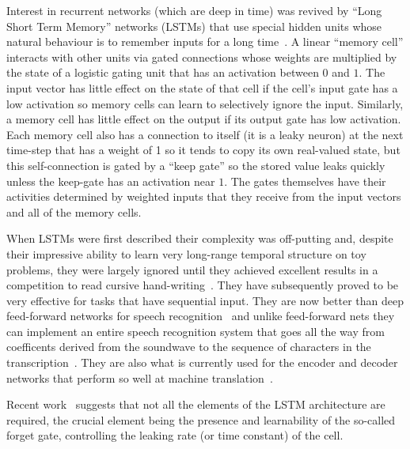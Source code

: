 \documentclass[]{article}
\begin{document}
Interest in recurrent networks (which are deep in time) was revived by
``Long Short Term Memory'' networks (LSTMs) that use special hidden units
whose natural behaviour is to remember inputs for a long
time~\citep{Hochreiter+Schmidhuber-1997}.  
A linear ``memory cell'' interacts with other units
via gated connections whose weights are multiplied by the state of a
logistic gating unit that has an activation between $0$ and $1$. The input
vector has little effect on the state of that cell if the cell's input
gate has a low activation so memory cells can learn to selectively ignore
the input.  Similarly, a memory cell has little effect on the output if its
output gate has low activation. Each memory cell also has a connection to
itself (it is a leaky neuron) at the next time-step that has a weight of 1 so it tends to copy its
own real-valued state, but this self-connection is gated by a ``keep gate'' so
the stored value leaks quickly unless the keep-gate has an activation
near $1$.  The gates themselves have their activities determined by
weighted inputs that they receive from the input vectors and all of the
memory cells.

When LSTMs were first described %
\citep{Hochreiter+Schmidhuber-1997} their complexity was off-putting
and, despite their impressive ability to learn very long-range temporal
structure on toy problems, they were largely ignored until they achieved
excellent results in a competition to read cursive
hand-writing~\citep{Graves-et-al-2009}. They have subsequently proved to be very
effective for tasks that have sequential input.  They are now better than
deep feed-forward networks for speech recognition~\citep{gravestimit} and
unlike feed-forward nets they can implement an entire speech recognition
system that goes all the way from coefficents derived from the soundwave to
the sequence of characters in the transcription~\citep{gravestimit}.  They
are also what is currently used for the encoder and decoder networks that
perform so well at machine
translation~\citep{Bahdanau-et-al-arxiv2014,Sutskever-et-al-NIPS2014}.

Recent work~\citep{Chung-et-al-NIPSDL2014,Yao-et-al-SLU-workshop2014} 
suggests that not all the elements of the LSTM
architecture are required, the crucial element being the presence and learnability 
of the so-called forget gate, controlling the leaking rate (or time constant) of the cell.
\end{document}
